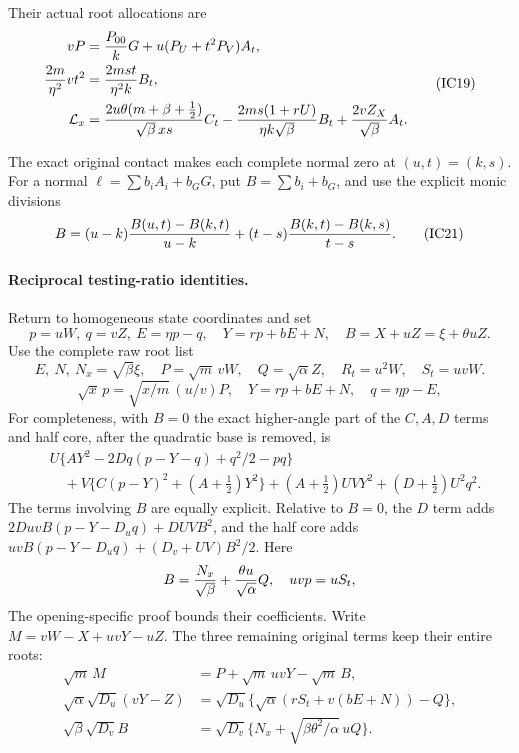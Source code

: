 Their actual root allocations are
\[
\begin{aligned}
 vP&={P_{00}\over k}G+u(P_U+t^2P_V)A_t,\\
 {2m\over\eta^2}vt^2&={2ms t\over\eta^2k}B_t,\\
 \mathcal L_x&={2u\theta(m+\beta+\tfrac12)
                    \over\sqrt\beta\,xs}C_t
 -{2ms(1+rU)\over\eta k\sqrt\beta}B_t
 +{2vZ_X\over\sqrt\beta}A_t.                          \end{aligned} \tag{IC19}
\]

The exact original contact makes each complete normal zero at
$(u,t)=(k,s)$. For a normal $\ell=\sum b_iA_i+b_GG$, put
$B=\sum b_i+b_G$, and use the explicit monic divisions
\[
 B=(u-k){B(u,t)-B(k,t)\over u-k}
       +(t-s){B(k,t)-B(k,s)\over t-s}.                 \tag{IC21}
\]

\paragraph{Reciprocal testing-ratio identities.}
Return to homogeneous state coordinates and set
\[
 p=uW,\ q=vZ,\ E=\eta p-q,\quad
 Y=rp+bE+N,\quad B=X+uZ=\xi+\theta uZ.
\]
Use the complete raw root list
\[
 E,\ N,\ N_x=\sqrt\beta\xi,\quad
 P=\sqrt m\,vW,\quad Q=\sqrt\alpha Z,\quad
 R_t=u^2W,\quad S_t=uvW.                              \tag{IC22}
\]
\[
 \sqrt x\,p=\sqrt{x/m}\,(u/v)P,\quad
 Y=rp+bE+N,\quad q=\eta p-E,                          \tag{IC23}
\]
For completeness, with $B=0$ the exact higher-angle part of the
$C,A,D$ terms and half core, after the quadratic base is removed, is
\[
\begin{split}
 &U\{AY^2-2Dq(p-Y-q)+q^2/2-pq\}\\
 &\quad+V\{C(p-Y)^2+(A+\tfrac12)Y^2\}
 +(A+\tfrac12)UVY^2+(D+\tfrac12)U^2q^2.               \end{split} \tag{IC24}
\]
The terms involving $B$ are equally explicit. Relative to $B=0$, the
$D$ term adds $2DuvB(p-Y-D_uq)+DUVB^2$, and the half core adds
$uvB(p-Y-D_uq)+(D_v+UV)B^2/2$.
Here
\[
 B={N_x\over\sqrt\beta}+{\theta u\over\sqrt\alpha}Q,
 \quad uvp=uS_t,
\]
The opening-specific proof bounds their coefficients.  Write
$M=vW-X+uvY-uZ$. The three remaining
original terms keep their entire roots:
\[
\begin{aligned}
 \sqrt m\,M&=P+\sqrt m\,uvY-\sqrt m\,B,\\
 \sqrt\alpha\sqrt{D_u}(vY-Z)
  &=\sqrt{D_u}\{\sqrt\alpha(rS_t+v(bE+N))-Q\},\\
 \sqrt\beta\sqrt{D_v}B
  &=\sqrt{D_v}\{N_x+\sqrt{\beta\theta^2/\alpha}\,uQ\}.
\end{aligned}                                                   \tag{IC26}
\]



